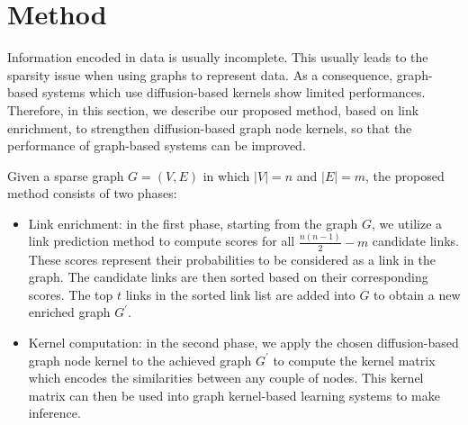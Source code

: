 
\section{Method}
\label{method}
Information encoded in data is usually incomplete. This usually leads to the sparsity issue when using graphs to represent  data. As a consequence,  graph-based systems which use diffusion-based kernels show limited performances. Therefore, in this section, we describe our proposed method, based on link enrichment, to strengthen diffusion-based graph node kernels, so that the performance of graph-based systems can be improved.

Given a sparse graph $G=(V, E)$ in which $|V| = n$ and $|E| = m$, the proposed method consists of two phases:
\begin{itemize}
\item Link enrichment: in the first phase, starting from the graph $G$, we utilize a link prediction method to compute scores for all $\frac{n(n-1)}{2}-m$ candidate links. These scores represent  their probabilities to be considered as a link in the graph. The candidate links are then sorted based on their corresponding scores. The top $t$ links in the sorted link list are added into $G$ to obtain a new enriched graph $G^{'}$.
\item Kernel computation: in the second phase, we apply the chosen diffusion-based graph node kernel to the achieved graph $G^{'}$ to compute the kernel matrix which encodes the similarities between any couple of nodes. This kernel matrix can then  be used into graph kernel-based learning systems to make inference.
\end{itemize}